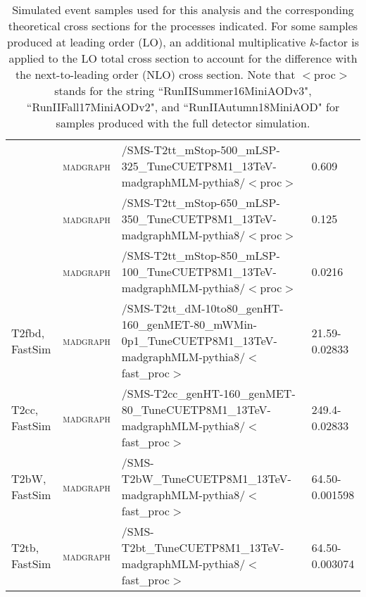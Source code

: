 \begin{table}[!htp]
\begin{center}
{\begin{tabular}{|l|l|l|l|}
     & \textsc{madgraph} & /SMS-T2tt\_mStop-500\_mLSP-325\_TuneCUETP8M1\_13TeV-madgraphMLM-pythia8/$<$proc$>$ & 0.609 \\
     & \textsc{madgraph} & /SMS-T2tt\_mStop-650\_mLSP-350\_TuneCUETP8M1\_13TeV-madgraphMLM-pythia8/$<$proc$>$ & 0.125 \\
     & \textsc{madgraph} & /SMS-T2tt\_mStop-850\_mLSP-100\_TuneCUETP8M1\_13TeV-madgraphMLM-pythia8/$<$proc$>$ & 0.0216 \\
\hline
T2fbd, FastSim & \textsc{madgraph} & /SMS-T2tt\_dM-10to80\_genHT-160\_genMET-80\_mWMin-0p1\_TuneCUETP8M1\_13TeV-madgraphMLM-pythia8/$<$fast\_proc$>$ & 21.59-0.02833 \\
T2cc, FastSim & \textsc{madgraph} & /SMS-T2cc\_genHT-160\_genMET-80\_TuneCUETP8M1\_13TeV-madgraphMLM-pythia8/$<$fast\_proc$>$ & 249.4-0.02833 \\
T2bW, FastSim & \textsc{madgraph} & /SMS-T2bW\_TuneCUETP8M1\_13TeV-madgraphMLM-pythia8/$<$fast\_proc$>$ & 64.50-0.001598 \\
T2tb, FastSim & \textsc{madgraph} & /SMS-T2bt\_TuneCUETP8M1\_13TeV-madgraphMLM-pythia8/$<$fast\_proc$>$ & 64.50-0.003074 \\
\hline
\end{tabular}
}
\end{center}
\caption[Signal Samples]{\label{tab:signals}Simulated event samples used for this analysis and the corresponding theoretical cross sections for the processes indicated. For some samples produced at leading order (LO), an additional multiplicative $k$-factor is applied to the LO total cross section to account for the difference with the next-to-leading order (NLO) cross section. Note that $<$proc$>$ stands for the string ``RunIISummer16MiniAODv3", ``RunIIFall17MiniAODv2", and ``RunIIAutumn18MiniAOD" for samples produced with the full detector simulation.}
\end{table}
